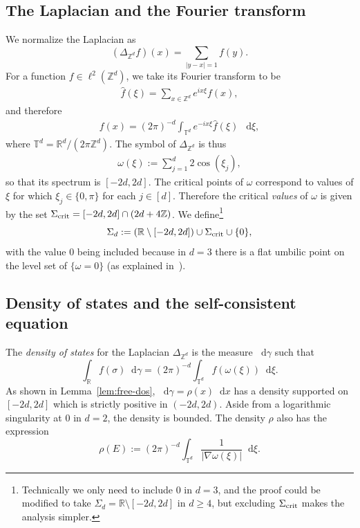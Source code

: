 \documentclass[11pt]{amsart}
\def\Real{{\mathbb R}}
\def\bbZ{{\mathbb Z}}
\def\Z{{\mathbb{Z}}}
\def\bbT{{\mathbb{T}}}
\def\Torus{{\mathbb T}}
\newcommand{\diff}{\mathop{}\!\mathrm{d}}
\numberwithin{equation}{section}
\numberwithin{theorem}{section}
\begin{document}
\subsection{The Laplacian and the Fourier transform}
We normalize the Laplacian as
\begin{equation}
\label{eq:laplacian-def}
(\Delta_{\bbZ^{d}}f)(x)=\sum_{|y-x|=1}f(y).
\end{equation}
For a function $f\in \ell^2(\bbZ^{d})$, we take its Fourier transform to be
\begin{align*}
	\hat{f}(\xi)=\sum_{x\in \bbZ^{d}}e^{ix\xi}f(x),
\end{align*}
and therefore
\begin{align*}
f(x)=(2\pi)^{-d}\int_{\bbT^{d}}e^{-ix\xi}\hat{f}(\xi)\:\diff\xi,
\end{align*}
where $\Torus^d = \Real^d / (2\pi \bbZ^d)$.
The symbol of $\Delta_{\Z^d}$ is thus
\begin{align*}
\omega(\xi):=\sum_{j=1}^{d}2\cos(\xi_j),
\end{align*}
so that its spectrum is $[-2d,2d]$.
The critical points of $\omega$ correspond
to values of $\xi$ for which $\xi_j \in\{0,\pi\}$ for each $j\in[d]$.  Therefore
the critical \textit{values} of $\omega$ is given by the set $\Sigma_{\rm crit} = [-2d,2d] \cap (2d+4\bbZ)$.  We define\footnote{Technically we only need to include $0$ in $d=3$, and the proof could be modified to take $\Sigma_d=\Real\setminus[-2d,2d]$ in $d\geq 4$, but excluding $\Sigma_{\rm crit}$ makes the analysis simpler.}
\[
\Sigma_d := (\Real \setminus [-2d,2d])\cup \Sigma_{\rm crit} \cup \{0\},
\]
with the value $0$ being included because in $d=3$ there is a flat umbilic point on the level set of $\{\omega = 0\}$ (as explained in~\cite{ErdosSalmhofer}).

\subsection{Density of states and the self-consistent equation}

The \textit{density of states} for the Laplacian
$\Delta_{\bbZ^d}$ is the measure $\diff \gamma$ such that
\[
\int_{\mathbb{R}} f(\sigma) \diff \gamma
= (2\pi)^{-d} \int_{\Torus^d} f(\omega(\xi))\diff\xi.
\]
As shown in Lemma~\ref{lem:free-dos}, $\diff \gamma = \rho(x)\diff x$ has a density supported on $[-2d,2d]$ which is strictly positive in $(-2d,2d)$.  Aside from a logarithmic singularity at $0$ in $d=2$,  the density is bounded.  The density $\rho$ also has the expression
\begin{equation}
\label{eq:rho-def}
\rho(E) := (2\pi)^{-d}\int_{\Torus^d}
\frac{1}{|\nabla \omega(\xi)|} \diff\xi.
\end{equation}
\end{document}
